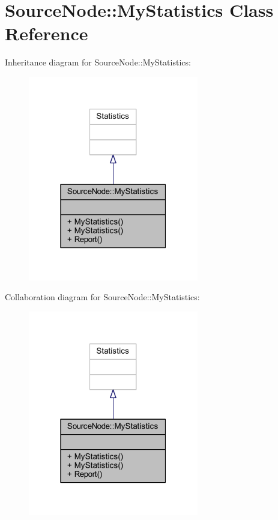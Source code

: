\hypertarget{class_source_node_1_1_my_statistics}{}\section{Source\+Node\+:\+:My\+Statistics Class Reference}
\label{class_source_node_1_1_my_statistics}


Inheritance diagram for Source\+Node\+:\+:My\+Statistics\+:\nopagebreak
\begin{figure}[H]
\begin{center}
\leavevmode
\includegraphics[width=211pt]{class_source_node_1_1_my_statistics__inherit__graph}
\end{center}
\end{figure}


Collaboration diagram for Source\+Node\+:\+:My\+Statistics\+:\nopagebreak
\begin{figure}[H]
\begin{center}
\leavevmode
\includegraphics[width=211pt]{class_source_node_1_1_my_statistics__coll__graph}
\end{center}
\end{figure}
